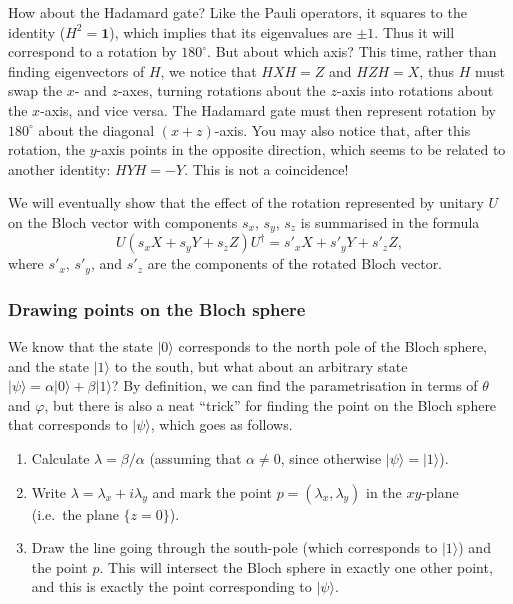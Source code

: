 \documentclass[fleqn,a4paper]{article}
\providecommand{\tightlist}{\setlength{\itemsep}{0pt}\setlength{\parskip}{0pt}}
\theoremstyle{definition}
\theoremstyle{definition}
\theoremstyle{definition}
\theoremstyle{definition}
\theoremstyle{remark}
\begin{document}
How about the Hadamard gate?
Like the Pauli operators, it squares to the identity (\(H^2=\mathbf{1}\)), which implies that its eigenvalues are \(\pm 1\).
Thus it will correspond to a rotation by \({180}^{\circ}\).
But about which axis?
This time, rather than finding eigenvectors of \(H\), we notice that \(HXH=Z\) and \(HZH=X\), thus \(H\) must swap the \(x\)- and \(z\)-axes, turning rotations about the \(z\)-axis into rotations about the \(x\)-axis, and vice versa.
The Hadamard gate must then represent rotation by \({180}^{\circ}\) about the diagonal \((x+z)\)-axis.
You may also notice that, after this rotation, the \(y\)-axis points in the opposite direction, which seems to be related to another identity: \(HYH=-Y\).
This is not a coincidence!

We will eventually show that the effect of the rotation represented by unitary \(U\) on the Bloch vector with components \(s_x\), \(s_y\), \(s_z\) is summarised in the formula
\[
  U (s_x X + s_y Y + s_z Z) U^\dagger
  = s'_x X+ s'_y Y + s'_z Z,
\]
where \(s'_x\), \(s'_y\), and \(s'_z\) are the components of the rotated Bloch vector.

\hypertarget{drawing-points-on-the-bloch-sphere}{%
\subsubsection{Drawing points on the Bloch sphere}\label{drawing-points-on-the-bloch-sphere}}

We know that the state \(|0\rangle\) corresponds to the north pole of the Bloch sphere, and the state \(|1\rangle\) to the south, but what about an arbitrary state \(|\psi\rangle=\alpha|0\rangle+\beta|1\rangle\)?
By definition, we can find the parametrisation in terms of \(\theta\) and \(\varphi\), but there is also a neat ``trick'' for finding the point on the Bloch sphere that corresponds to \(|\psi\rangle\), which goes as follows.

\begin{enumerate}
\def\labelenumi{\arabic{enumi}.}
\tightlist
\item
  Calculate \(\lambda=\beta/\alpha\) (assuming that \(\alpha\neq0\), since otherwise \(|\psi\rangle=|1\rangle\)).
\item
  Write \(\lambda=\lambda_x+i\lambda_y\) and mark the point \(p=(\lambda_x,\lambda_y)\) in the \(xy\)-plane (i.e.~the plane \(\{z=0\}\)).
\item
  Draw the line going through the south-pole (which corresponds to \(|1\rangle\)) and the point \(p\). This will intersect the Bloch sphere in exactly one other point, and this is exactly the point corresponding to \(|\psi\rangle\).
\end{enumerate}
\end{document}
